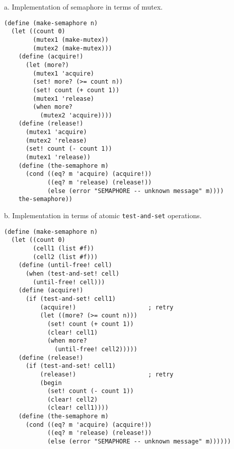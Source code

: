 \documentclass[a4paper,12pt]{article}
\begin{document}
a.  Implementation of semaphore in terms of mutex.
\begin{lstlisting}
(define (make-semaphore n)
  (let ((count 0)
        (mutex1 (make-mutex))
        (mutex2 (make-mutex)))
    (define (acquire!)
      (let (more?)
        (mutex1 'acquire)
        (set! more? (>= count n))
        (set! count (+ count 1))
        (mutex1 'release)
        (when more?
          (mutex2 'acquire))))
    (define (release!)
      (mutex1 'acquire)
      (mutex2 'release)
      (set! count (- count 1))
      (mutex1 'release))
    (define (the-semaphore m)
      (cond ((eq? m 'acquire) (acquire!))
            ((eq? m 'release) (release!))
            (else (error "SEMAPHORE -- unknown message" m))))
    the-semaphore))
\end{lstlisting}

b.  Implementation in terms of atomic \lstinline!test-and-set!
operations.
\begin{lstlisting}
(define (make-semaphore n)
  (let ((count 0)
        (cell1 (list #f))
        (cell2 (list #f)))
    (define (until-free! cell)
      (when (test-and-set! cell)
        (until-free! cell)))
    (define (acquire!)
      (if (test-and-set! cell1)
          (acquire!)                    ; retry
          (let ((more? (>= count n)))
            (set! count (+ count 1))
            (clear! cell1)
            (when more?
              (until-free! cell2)))))
    (define (release!)
      (if (test-and-set! cell1)
          (release!)                    ; retry
          (begin
            (set! count (- count 1))
            (clear! cell2)
            (clear! cell1))))
    (define (the-semaphore m)
      (cond ((eq? m 'acquire) (acquire!))
            ((eq? m 'release) (release!))
            (else (error "SEMAPHORE -- unknown message" m))))))
\end{lstlisting}
\end{document}
